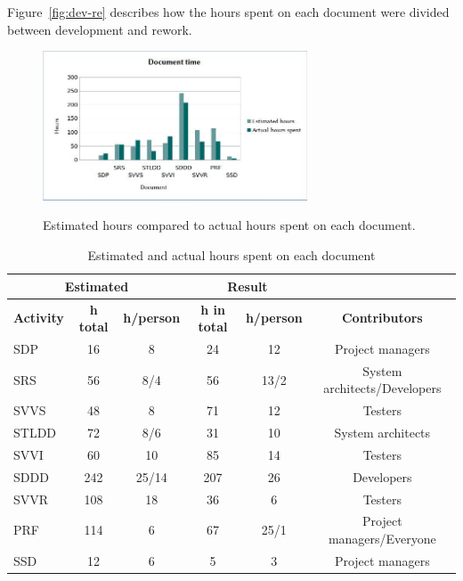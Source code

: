 \documentclass[a4paper]{article}
\begin{document}
Figure~\ref{fig:dev-re} describes how the hours spent on each document were divided between development and rework. 

\begin{figure}[h!]
\centering
\includegraphics[width=0.7\textwidth]{doc.jpg}
\label{fig:doc}
\caption{Estimated hours compared to actual hours spent on each document.}
\end{figure}

\FloatBarrier

\begin{table}[h!]
\centering
\caption{Estimated and actual hours spent on each document}
\begin{tabular}{|l|c|c||c|c|c|}
 \hline
 
\multicolumn{3}{|c||}{\textbf{Estimated}} & \multicolumn{2}{|c|}{\textbf{Result}} & \multicolumn{1}{|c|}{\textbf{}}\\ \hline \hline
\textbf{Activity} & \textbf{h total} & \textbf{h/person} & \textbf{h in total} & \textbf{h/person} & \textbf{Contributors} \\ \hline
SDP & 16 & 8 & 24 & 12 & Project managers \\ \hline
SRS & 56 & 8/4 & 56 & 13/2 & System architects/Developers\\ \hline
SVVS & 48 & 8 & 71 & 12 & Testers \\ \hline
STLDD & 72 & 8/6 & 31 & 10 & System architects\\ \hline
SVVI & 60 & 10 & 85 &14 & Testers\\ \hline 
SDDD & 242 & 25/14 & 207 & 26 & Developers\\ \hline
SVVR & 108 & 18 & 36 & 6 & Testers\\ \hline
PRF & 114 & 6 & 67 & 25/1 & Project managers/Everyone\\ \hline
SSD & 12 & 6 & 5 & 3 & Project managers \\ \hline

\end{tabular}
\label{table:time}
\end{table}
\end{document}
